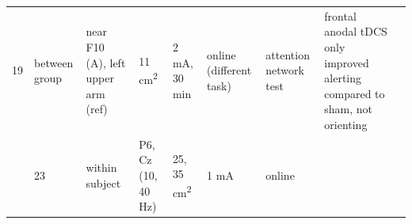 \documentclass[11pt,]{memoir}
\begin{document}
\begin{longtable}[]{@{}lllllllll@{}}
\begin{minipage}[t]{0.02\columnwidth}
19\strut
\end{minipage} & \begin{minipage}[t]{0.04\columnwidth}\raggedright
between
group\strut
\end{minipage} & \begin{minipage}[t]{0.11\columnwidth}\raggedright
near F10 (A), left upper
arm (ref)\strut
\end{minipage} & \begin{minipage}[t]{0.03\columnwidth}\raggedright
11
cm\textsuperscript{2}\strut
\end{minipage} & \begin{minipage}[t]{0.05\columnwidth}\raggedright
2 mA, 30
min\strut
\end{minipage} & \begin{minipage}[t]{0.05\columnwidth}\raggedright
online
(different
task)\strut
\end{minipage} & \begin{minipage}[t]{0.11\columnwidth}\raggedright
attention network test\strut
\end{minipage} & \begin{minipage}[t]{0.24\columnwidth}\raggedright
frontal anodal tDCS only improved alerting compared to sham,
not orienting\strut
\end{minipage}\tabularnewline
\begin{minipage}[t]{0.12\columnwidth}\raggedright
\textcite{Hopfinger2016}\strut
\end{minipage} & \begin{minipage}[t]{0.02\columnwidth}\raggedright
23\strut
\end{minipage} & \begin{minipage}[t]{0.04\columnwidth}\raggedright
within
subject\strut
\end{minipage} & \begin{minipage}[t]{0.11\columnwidth}\raggedright
P6, Cz (10, 40 Hz)\strut
\end{minipage} & \begin{minipage}[t]{0.03\columnwidth}\raggedright
25,
35
cm\textsuperscript{2}\strut
\end{minipage} & \begin{minipage}[t]{0.05\columnwidth}\raggedright
1 mA\strut
\end{minipage} & \begin{minipage}[t]{0.05\columnwidth}\raggedright
online\strut
\end{minipage} & \begin{minipage}[t]{0.11\columnwidth}\raggedright

\end{minipage}
\end{longtable}
\end{document}
